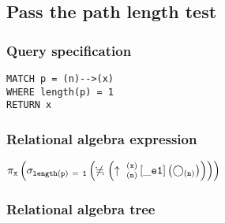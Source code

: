 
\subsection{Pass the path length test}

\subsubsection*{Query specification}

\begin{lstlisting}
MATCH p = (n)-->(x)
WHERE length(p) = 1
RETURN x
\end{lstlisting}

\subsubsection*{Relational algebra expression}

$\projection{\var{x}} \left(\selection{\mathtt{length(p)~=~1}} \left(\alldifferent{} \left(\expandout{n}{x}{}{\_e1}{} \left(\getvertices{n}{}\right)\right)\right)\right)$

\subsubsection*{Relational algebra tree}


